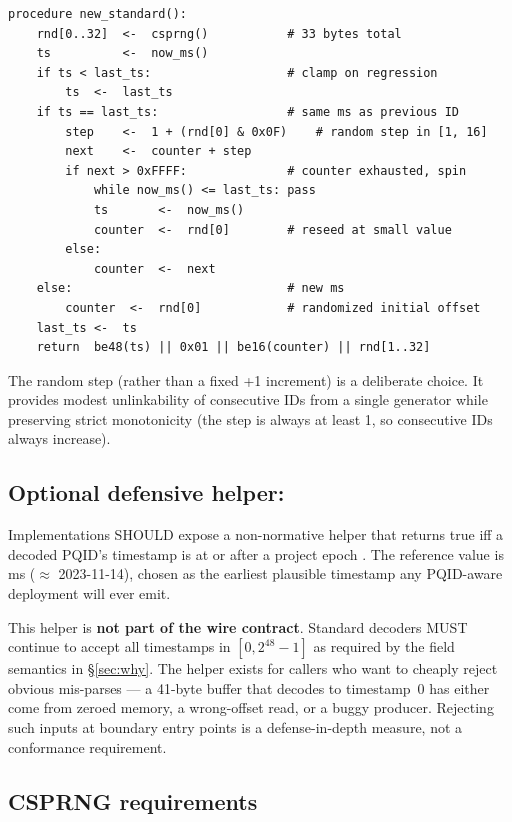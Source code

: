 \begin{lstlisting}[language=Pseudocode,caption={Standard PQID generation},label={lst:gen-std}]
procedure new_standard():
    rnd[0..32]  <-  csprng()           # 33 bytes total
    ts          <-  now_ms()
    if ts < last_ts:                   # clamp on regression
        ts  <-  last_ts
    if ts == last_ts:                  # same ms as previous ID
        step    <-  1 + (rnd[0] & 0x0F)    # random step in [1, 16]
        next    <-  counter + step
        if next > 0xFFFF:              # counter exhausted, spin
            while now_ms() <= last_ts: pass
            ts       <-  now_ms()
            counter  <-  rnd[0]        # reseed at small value
        else:
            counter  <-  next
    else:                              # new ms
        counter  <-  rnd[0]            # randomized initial offset
    last_ts <-  ts
    return  be48(ts) || 0x01 || be16(counter) || rnd[1..32]
\end{lstlisting}

The random step (rather than a fixed +1 increment) is a deliberate choice. It provides modest unlinkability of consecutive IDs from a single generator while preserving strict monotonicity (the step is always at least 1, so consecutive IDs always increase).

\subsection{Optional defensive helper: }
\label{sec:min-timestamp}

Implementations SHOULD expose a non-normative helper that returns true iff a decoded PQID's timestamp is at or after a project epoch . The reference value is  ms ($\approx$ 2023-11-14), chosen as the earliest plausible timestamp any PQID-aware deployment will ever emit.

This helper is \textbf{not part of the wire contract}. Standard decoders MUST continue to accept all timestamps in $[0, 2^{48} - 1]$ as required by the field semantics in §\ref{sec:why}. The helper exists for callers who want to cheaply reject obvious mis-parses — a 41-byte buffer that decodes to timestamp~0 has either come from zeroed memory, a wrong-offset read, or a buggy producer. Rejecting such inputs at boundary entry points is a defense-in-depth measure, not a conformance requirement.

\subsection{CSPRNG requirements}
\label{sec:csprng}

